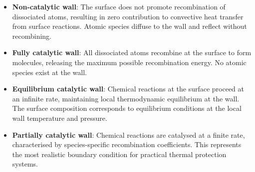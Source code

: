 \begin{itemize}
    \item \textbf{Non-catalytic wall}: The surface does not promote recombination of dissociated atoms, resulting in zero contribution to convective heat transfer from surface reactions. Atomic species diffuse to the wall and reflect without recombining.
    
    \item \textbf{Fully catalytic wall}: All dissociated atoms recombine at the surface to form molecules, releasing the maximum possible recombination energy. No atomic species exist at the wall.
    
    \item \textbf{Equilibrium catalytic wall}: Chemical reactions at the surface proceed at an infinite rate, maintaining local thermodynamic equilibrium at the wall. The surface composition corresponds to equilibrium conditions at the local wall temperature and pressure.
    
    \item \textbf{Partially catalytic wall}: Chemical reactions are catalysed at a finite rate, characterised by species-specific recombination coefficients. This represents the most realistic boundary condition for practical thermal protection systems.
\end{itemize}




